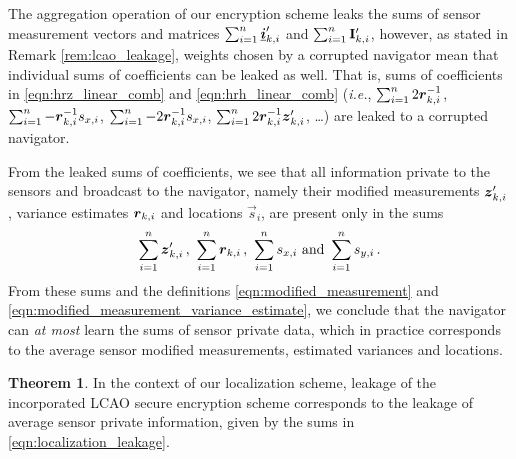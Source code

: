 \documentclass[10pt,letterpaper,oneside,twocolumn,journal]{IEEEtran}
\theoremstyle{definition}
\theoremstyle{definition}
\newtheorem{theorem}{Theorem}[section]
\theoremstyle{remark}
\begin{document}
The aggregation operation of our encryption scheme leaks the sums of sensor measurement vectors and matrices $\sum_{i=1}^n{\boldsymbol{\underline{i}}}'_{k,i}$ and $\sum_{i=1}^n{{\mathbf{I}}}'_{k,i}$, however, as stated in Remark \ref{rem:lcao_leakage}, weights chosen by a corrupted navigator mean that individual sums of coefficients can be leaked as well. That is, sums of coefficients in \eqref{eqn:hrz_linear_comb} and \eqref{eqn:hrh_linear_comb} (\textit{i.e.}, $\sum_{i=1}^n2{\boldsymbol{r}}^{-1}_{k,i}$, $\sum_{i=1}^n-{\boldsymbol{r}}^{-1}_{k,i}s_{x,i}$, $\sum_{i=1}^n-2{\boldsymbol{r}}^{-1}_{k,i}s_{x,i}$, $\sum_{i=1}^n2{\boldsymbol{r}}^{-1}_{k,i}{\boldsymbol{z}}'_{k,i}$, \dots) are leaked to a corrupted navigator.

From the leaked sums of coefficients, we see that all information private to the sensors and broadcast to the navigator, namely their modified measurements ${\boldsymbol{z}}'_{k,i}$, variance estimates ${\boldsymbol{r}}_{k,i}$ and locations $\vec{s}_i$, are present only in the sums
\begin{equation}
    \sum_{i=1}^n\rv{z}'_{k,i}\,,\ \sum_{i=1}^n\rv{r}_{k,i}\,,\ \sum_{i=1}^ns_{x,i}\ \textrm{and}\ \sum_{i=1}^ns_{y,i}\,.\label{eqn:localization_leakage}
\end{equation}
From these sums and the definitions \eqref{eqn:modified_measurement} and \eqref{eqn:modified_measurement_variance_estimate}, we conclude that the navigator can \textit{at most} learn the sums of sensor private data, which in practice corresponds to the average sensor modified measurements, estimated variances and locations.
\begin{theorem}
    In the context of our localization scheme, leakage of the incorporated LCAO secure encryption scheme corresponds to the leakage of average sensor private information, given by the sums in \eqref{eqn:localization_leakage}.
\end{theorem}

% 
%                                                                          
%                                                                          
%                                                                          
% 
\end{document}
